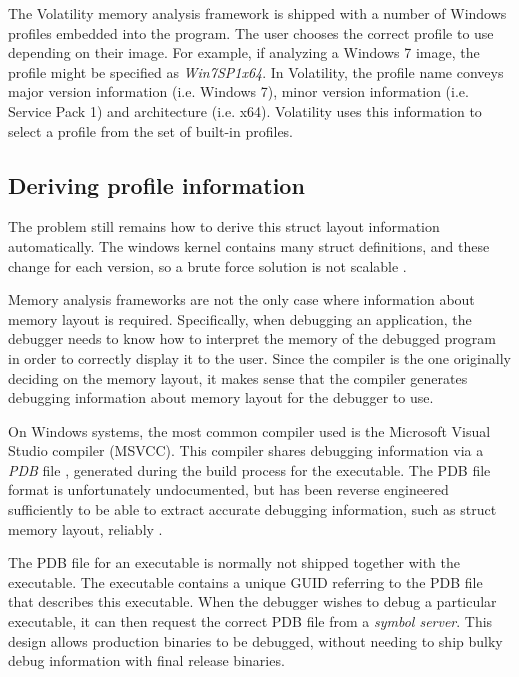 The Volatility memory analysis framework \citep{volatility} is shipped with a
number of Windows profiles embedded into the program. The user chooses the
correct profile to use depending on their image. For example, if analyzing a
Windows 7 image, the profile might be specified as {\em Win7SP1x64}. In
Volatility, the profile name conveys major version information (i.e. Windows 7),
minor version information (i.e. Service Pack 1) and architecture
(i.e. x64). Volatility uses this information to select a profile from the set of
built-in profiles.

\subsection{Deriving profile information}
The problem still remains how to derive this struct layout information
automatically. The windows kernel contains many struct definitions, and these
change for each version, so a brute force solution is not scalable
\citep{okolica2010windows}.

Memory analysis frameworks are not the only case where information about memory
layout is required. Specifically, when debugging an application, the debugger
needs to know how to interpret the memory of the debugged program in order to
correctly display it to the user. Since the compiler is the one originally
deciding on the memory layout, it makes sense that the compiler generates
debugging information about memory layout for the debugger to use.

On Windows systems, the most common compiler used is the Microsoft Visual Studio
compiler (MSVCC). This compiler shares debugging information via a {\em PDB}
file \citep{Schreiber:2001:UWS:375734}, generated during the build process for
the executable. The PDB file format is unfortunately undocumented, but has been
reverse engineered sufficiently to be able to extract accurate debugging
information, such as struct memory layout, reliably
\citep{Schreiber:2001:UWS:375734,moyix2007}.

The PDB file for an executable is normally not shipped together with the
executable. The executable contains a unique GUID referring to the PDB file that
describes this executable. When the debugger wishes to debug a particular
executable, it can then request the correct PDB file from a {\em symbol
  server}. This design allows production binaries to be debugged, without
needing to ship bulky debug information with final release binaries.

